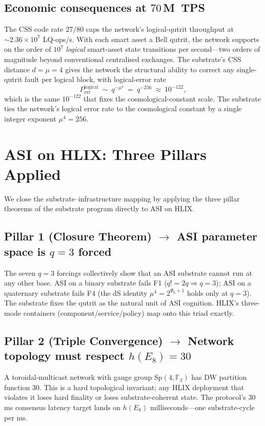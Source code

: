 \documentclass[11pt,letterpaper]{article}
\theoremstyle{remark}
\newcommand{\Sp}{\mathrm{Sp}}
\newcommand{\FF}{\mathbb{F}}
\begin{document}
\subsection{Economic consequences at $70$\,M~TPS}
The CSS code rate $27/80$ caps the network's logical-qutrit throughput at
$\sim\!2.36\times 10^7$ LQ-ops/s. With each smart asset a Bell qutrit, the network supports
on the order of $10^7$ \emph{logical} smart-asset state transitions per second---two orders of
magnitude beyond conventional centralised exchanges. The substrate's CSS distance $d=\mu=4$
gives the network the structural ability to correct any single-qutrit fault per logical
block, with logical-error rate
\[
P_{\mathrm{err}}^{\mathrm{logical}}\ \sim\ q^{-\mu^4}\ =\ q^{-256}\ \approx\ 10^{-122},
\]
which is the same $10^{-122}$ that fixes the cosmological-constant scale. The substrate
ties the network's logical error rate to the cosmological constant by a single integer
exponent $\mu^4=256$.

\section{ASI on HLIX: Three Pillars Applied}

We close the substrate--infrastructure mapping by applying the three pillar theorems of the
substrate program directly to ASI on HLIX.

\subsection{Pillar 1 (Closure Theorem) $\to$ ASI parameter space is $q=3$ forced}
The seven $q=3$ forcings collectively show that an ASI substrate cannot run at any other
base. ASI on a binary substrate fails F1 ($q!=2q\Rightarrow q=3$); ASI on a quaternary
substrate fails F4 (the dS identity $\mu^4=2^{\Phi_6+1}$ holds only at $q=3$). The substrate
fixes the qutrit as the natural unit of ASI cognition. HLIX's three-mode containers
(component/service/policy) map onto this triad exactly.

\subsection{Pillar 2 (Triple Convergence) $\to$ Network topology must respect $h(E_8)=30$}
A toroidal-multicast network with gauge group $\Sp(4,\FF_3)$ has DW partition function
$30$. This is a hard topological invariant; any HLIX deployment that violates it loses
hard finality or loses substrate-coherent state. The protocol's $30$\,ms consensus latency
target lands on $h(E_8)$ milliseconds---one substrate-cycle per ms.
\end{document}
